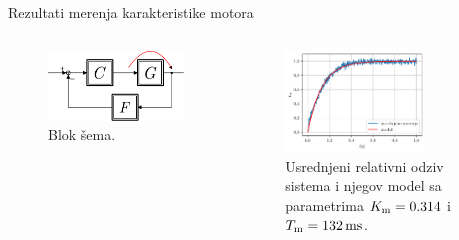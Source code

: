 \documentclass[aspectratio=169,xcolor=dvipsnames]{beamer}
\begin{document}


\begin{frame}{Rezultati merenja karakteristike motora}
	\begin{columns}[c]
    \begin{column}{.3\textwidth}
    \begin{figure}
        \centering
        \includegraphics[scale = 0.5]{h/Hmotor1.pdf}
        \caption{Blok šema.}
    \end{figure}      
    \end{column}
    \begin{column}{.7\textwidth}
    \begin{figure}
        \centering
        \includegraphics[width=0.75\textwidth]{fig/pi/Hsrednje.pdf}
        \caption{Usrednjeni relativni odziv sistema i njegov model sa parametrima $K_{\rm m} = 0.314$ i $T_{\rm m} = 132 \, \rm{ms}$.}
    \end{figure}
    \end{column}
\end{columns}
\end{frame}


\end{document}
